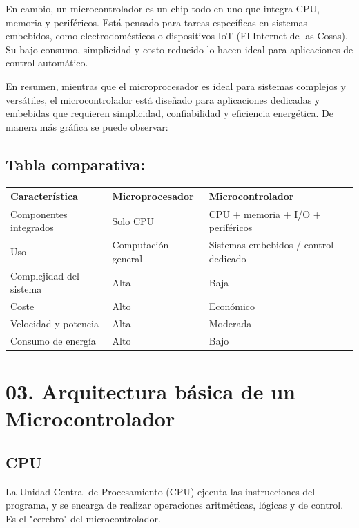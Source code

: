 \documentclass[a4paper,11pt]{article}
\begin{document}
\bigskip

En cambio, un microcontrolador es un chip todo-en-uno que integra CPU, memoria y periféricos. Está pensado para tareas específicas en sistemas embebidos, como electrodomésticos o dispositivos IoT (El Internet de las Cosas). Su bajo consumo, simplicidad y costo reducido lo hacen ideal para aplicaciones de control automático.

\bigskip

En resumen, mientras que el microprocesador es ideal para sistemas complejos y versátiles, el microcontrolador está diseñado para aplicaciones dedicadas y embebidas que requieren simplicidad, confiabilidad y eficiencia energética. De manera más gráfica se puede observar:

\subsection{Tabla comparativa:}


\begin{center}
\begin{tabular}{|l|l|l|}
\hline
\textbf{Caracter\'istica} & \textbf{Microprocesador} & \textbf{Microcontrolador} \\
\hline
Componentes integrados & Solo CPU & CPU + memoria + I/O + perif\'ericos \\
Uso & Computaci\'on general & Sistemas embebidos / control dedicado \\
Complejidad del sistema & Alta & Baja \\
Coste & Alto & Econ\'omico \\
Velocidad y potencia & Alta & Moderada \\
Consumo de energ\'ia & Alto & Bajo \\
\hline
\end{tabular}
\end{center}

\section{03. Arquitectura b\'asica de un Microcontrolador}

\subsection{CPU}
La Unidad Central de Procesamiento (CPU) ejecuta las instrucciones del programa, y se encarga de realizar operaciones aritm\'eticas, l\'ogicas y de control. Es el "cerebro" del microcontrolador.
\end{document}
